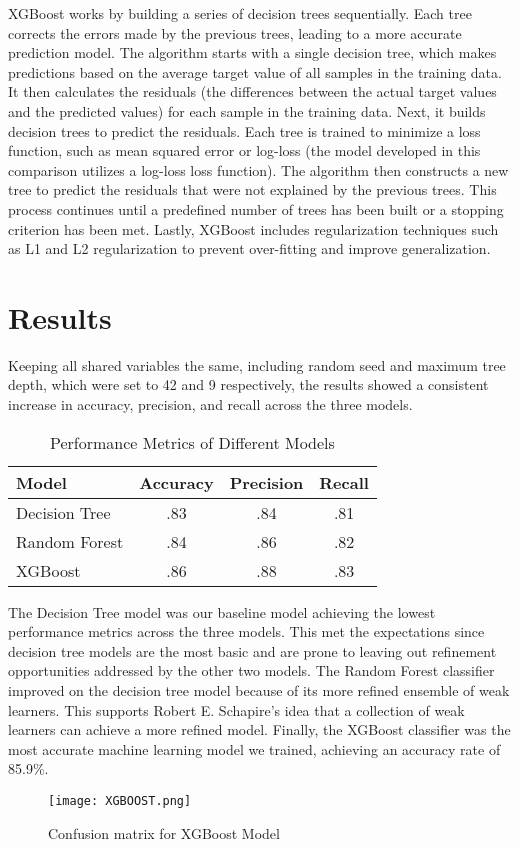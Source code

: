 \documentclass[twoside,twocolumn]{article}
\begin{document}
XGBoost works by building a series of decision trees sequentially. Each tree corrects the errors made by the previous trees, leading to a more accurate prediction model. The algorithm starts with a single decision tree, which makes predictions based on the average target value of all samples in the training data. It then calculates the residuals (the differences between the actual target values and the predicted values) for each sample in the training data. Next, it builds decision trees to predict the residuals. Each tree is trained to minimize a loss function, such as mean squared error or log-loss (the model developed in this comparison utilizes a log-loss loss function). The algorithm then constructs a new tree to predict the residuals that were not explained by the previous trees. This process continues until a predefined number of trees has been built or a stopping criterion has been met. Lastly, XGBoost includes regularization techniques such as L1 and L2 regularization to prevent over-fitting and improve generalization.


\section{Results}
Keeping all shared variables the same, including random seed and maximum tree depth, which were set to 42 and 9 respectively, the results showed a consistent increase in accuracy, precision, and recall across the three models.

\begin{table}[htbp]
\centering
\begin{tabular}{lccc}
\toprule
\textbf{Model} & \textbf{Accuracy} & \textbf{Precision} & \textbf{Recall} \\
\midrule
Decision Tree & .83 & .84 & .81 \\
Random Forest & .84 & .86 & .82 \\
XGBoost & .86 & .88 & .83 \\
\bottomrule
\end{tabular}
\caption{Performance Metrics of Different Models}
\label{tab:performance-metrics}
\end{table}

The Decision Tree model was our baseline model achieving the lowest performance metrics across the three models. This met the expectations since decision tree models are the most basic and are prone to leaving out refinement opportunities addressed by the other two models. The Random Forest classifier improved on the decision tree model because of its more refined ensemble of weak learners. This supports Robert E. Schapire's idea that a collection of weak learners can achieve a more refined model. Finally, the XGBoost classifier was the most accurate machine learning model we trained, achieving an accuracy rate of 85.9\%.
\begin{figure}
  \texttt{[image: XGBOOST.png]}
  \caption{Confusion matrix for XGBoost Model}
  \label{fig:matrix}
\end{figure}
\end{document}

